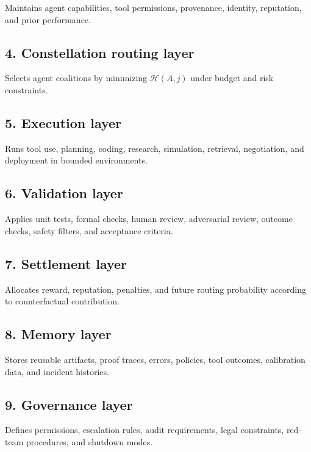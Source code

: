 \documentclass[
  11pt,
]{article}
\begin{document}
Maintains agent capabilities, tool permissions, provenance, identity,
reputation, and prior performance.

\subsection{4. Constellation routing
layer}\label{constellation-routing-layer}

Selects agent coalitions by minimizing \(\mathcal{H}(A,j)\) under budget
and risk constraints.

\subsection{5. Execution layer}\label{execution-layer}

Runs tool use, planning, coding, research, simulation, retrieval,
negotiation, and deployment in bounded environments.

\subsection{6. Validation layer}\label{validation-layer}

Applies unit tests, formal checks, human review, adversarial review,
outcome checks, safety filters, and acceptance criteria.

\subsection{7. Settlement layer}\label{settlement-layer}

Allocates reward, reputation, penalties, and future routing probability
according to counterfactual contribution.

\subsection{8. Memory layer}\label{memory-layer}

Stores reusable artifacts, proof traces, errors, policies, tool
outcomes, calibration data, and incident histories.

\subsection{9. Governance layer}\label{governance-layer}

Defines permissions, escalation rules, audit requirements, legal
constraints, red-team procedures, and shutdown modes.
\end{document}
